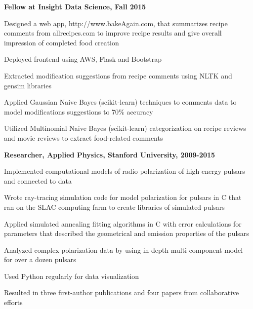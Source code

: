 \begin{cvlist}
  \item \textbf{Fellow at Insight Data Science, Fall 2015}
  \begin{cvsublist}
      \item Designed a web app, http://www.bakeAgain.com, that summarizes recipe comments from allrecipes.com to improve recipe results and give overall impression of completed food creation
      \item Deployed frontend using AWS, Flask and Bootstrap
      \item Extracted modification suggestions from recipe comments using NLTK and gensim libraries
      \item Applied Gaussian Naive Bayes (scikit-learn) techniques to comments data to model modifications suggestions to 70\% accuracy
      \item Utilized Multinomial Naive Bayes (scikit-learn) categorization on recipe reviews and movie reviews to extract food-related comments
  \end{cvsublist}
  \item \textbf{Researcher, Applied Physics, Stanford University, 2009-2015}
  \begin{cvsublist}
    \item Implemented computational models of radio polarization of high energy pulsars and connected to data
    \item Wrote ray-tracing simulation code for model polarization for pulsars in C that ran on the SLAC computing farm to create libraries of simulated pulsars
    \item Applied simulated annealing fitting algorithms in C with error calculations for parameters that described the geometrical and emission properties of the pulsars
    \item Analyzed complex polarization data by using in-depth multi-component model for over a dozen pulsars
    \item Used Python regularly for data visualization
    \item Resulted in three first-author publications and four papers from collaborative efforts    

  \end{cvsublist}
\end{cvlist}
